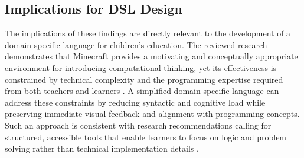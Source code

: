 \subsection{Implications for DSL Design}

The implications of these findings are directly relevant to the development of a domain-specific language for children's education. 
The reviewed research demonstrates that Minecraft provides a motivating and conceptually appropriate environment for introducing computational thinking, yet its effectiveness is constrained by technical complexity and the programming expertise required from both teachers and learners \cite{md_shamsudin_crafting_2024}. 
A simplified domain-specific language can address these constraints by reducing syntactic and cognitive load while preserving immediate visual feedback and alignment with programming concepts. 
Such an approach is consistent with research recommendations calling for structured, accessible tools that enable learners to focus on logic and problem solving rather than technical implementation details \cite{md_shamsudin_crafting_2024}.
